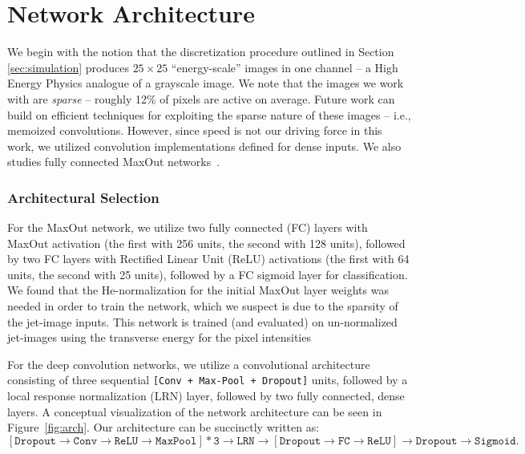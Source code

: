 
\section{Network Architecture}
\label{sec:arch}


We begin with the notion that the discretization procedure outlined in Section \ref{sec:simulation} produces $25\times 25$ ``energy-scale'' images in one channel -- a High Energy Physics analogue of a grayscale image. We note that the images we work with are \emph{sparse} -- roughly 12\% of pixels are active on average. Future work can build on efficient techniques for exploiting the sparse nature of these images -- i.e., memoized convolutions. However, since speed is not our driving force in this work, we utilized convolution implementations defined for dense inputs.  We also studies fully connected MaxOut networks~\cite{maxout:goodfellow}.

\subsubsection{Architectural Selection} %
\label{ssub:architectural_selection}
For the MaxOut network, we utilize two fully connected (FC) layers with MaxOut activation (the first with 256 units, the second with 128 units), followed by two FC layers with Rectified Linear Unit (ReLU) activations (the first with 64 units, the second with 25 units), followed by a FC sigmoid layer for classification.  We found that the He-normalization for the initial MaxOut layer weights was needed in order to train the network, which we suspect is due to the sparsity of the jet-image inputs.  This network is trained (and evaluated) on un-normalized jet-images using the transverse energy for the pixel intensities

For the deep convolution networks, we utilize a convolutional architecture consisting of three sequential \texttt{[Conv + Max-Pool + Dropout]} units, followed by a local response normalization (LRN) layer, followed by two fully connected, dense layers. A conceptual visualization of the network architecture can be seen in Figure~\ref{fig:arch}. Our architecture can be succinctly written as:
\begin{equation}
  \mathtt{[Dropout \rightarrow Conv \rightarrow ReLU \rightarrow MaxPool] * 3 \rightarrow LRN \rightarrow [Dropout \rightarrow FC \rightarrow ReLU]  \rightarrow Dropout \rightarrow Sigmoid}.
\end{equation}

